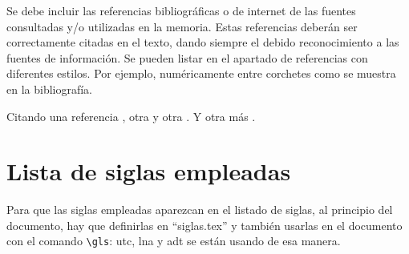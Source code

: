 \noindent Se debe incluir las referencias bibliográficas o de internet de las fuentes consultadas y/o
utilizadas en la memoria. Estas referencias deberán ser correctamente citadas en el texto, dando
siempre el debido reconocimiento a las fuentes de información. Se pueden listar en el apartado
de referencias con diferentes estilos.
Por ejemplo, numéricamente entre corchetes como se muestra en la bibliografía.

Citando una referencia \cite{Smith1997}, otra \cite{Orfanidis1996} y otra \cite{Wyndrum1965}. Y otra más \cite{Dai2010}.

\section{Lista de siglas empleadas}

Para que las siglas empleadas aparezcan en el listado de siglas, al principio del documento, hay que definirlas en ``siglas.tex'' y también usarlas en el documento con el comando \verb+\gls+: \gls{utc}, \gls{lna} y \gls{adt} se están usando de esa manera.